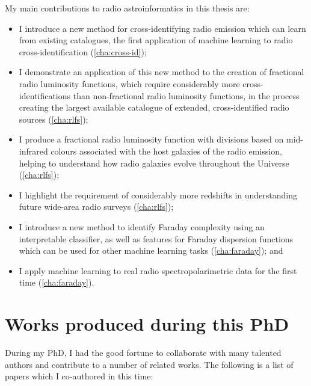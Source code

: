 My main contributions to radio astroinformatics in this thesis are:
\begin{itemize}
    \item I introduce a new method for cross-identifying radio emission which can learn from existing catalogues, the first application of machine learning to radio cross-identification (\autoref{cha:cross-id});
    \item I demonstrate an application of this new method to the creation of fractional radio luminosity functions, which require considerably more cross-identifications than non-fractional radio luminosity functions, in the process creating the largest available catalogue of extended, cross-identified radio sources (\autoref{cha:rlfs});
    \item I produce a fractional radio luminosity function with divisions based on mid-infrared colours associated with the host galaxies of the radio emission, helping to understand how radio galaxies evolve throughout the Universe (\autoref{cha:rlfs});
    \item I highlight the requirement of considerably more redshifts in understanding future wide-area radio surveys (\autoref{cha:rlfs});
    \item I introduce a new method to identify Faraday complexity using an interpretable classifier, as well as features for Faraday dispersion functions which can be used for other machine learning tasks (\autoref{cha:faraday}); and
    \item I apply machine learning to real radio spectropolarimetric data for the first time (\autoref{cha:faraday}).
\end{itemize}

\newpage

\section{Works produced during this PhD}
\label{sec:works}

During my PhD, I had the good fortune to collaborate with many talented authors and contribute to a number of related works. The following is a list of papers which I co-authored in this time:

